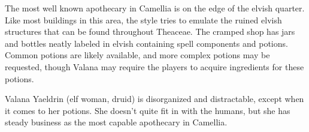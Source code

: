 The most well known apothecary in Camellia is on the edge of the elvish quarter.
Like most buildings in this area, the style tries to emulate the ruined elvish structures that can be found throughout Theaceae.
The cramped shop has jars and bottles neatly labeled in elvish containing spell components and potions.
Common potions are likely available, and more complex potions may be requested, though Valana may require the players to acquire ingredients for these potions.

Valana Yaeldrin (elf woman, druid) is disorganized and distractable, except when it comes to her potions.
She doesn't quite fit in with the humans, but she has steady business as the most capable apothecary in Camellia.
